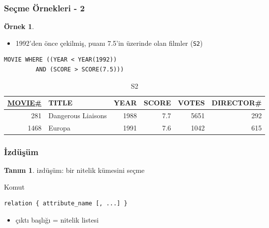 \documentclass[dvipsnames]{beamer}
\theoremstyle{definition}
\newtheorem{tanim}[theorem]{Tanım}
\theoremstyle{example}
\newtheorem{ornek}[theorem]{Örnek}
\theoremstyle{plain}
\begin{document}
\begin{frame}[fragile]
  \frametitle{Seçme Örnekleri - 2}

  \begin{ornek}
    \begin{itemize}
      \item 1992'den önce çekilmiş, puanı 7.5'in üzerinde olan filmler
        (\texttt{S2})
    \end{itemize}

    \begin{lstlisting}
MOVIE WHERE ((YEAR < YEAR(1992))
         AND (SCORE > SCORE(7.5)))
    \end{lstlisting}

    \pause
    \vspace{-10pt}
    \begin{tiny}
    \begin{table}
      \caption{S2}
      \begin{tabular}{|r|l|r|r|r|r|}\hline
\underline{MOVIE\#} & TITLE & YEAR & SCORE & VOTES & DIRECTOR\#\\[2pt]\hline\hline
   281 & Dangerous Liaisons & 1988 &   7.7 &  5651 &        292\\\hline
  1468 & Europa             & 1991 &   7.6 &  1042 &        615\\\hline
      \end{tabular}
    \end{table}
    \end{tiny}
  \end{ornek}
\end{frame}

\begin{frame}[fragile]
  \frametitle{İzdüşüm}

  \begin{tanim}
    \alert{izdüşüm}: bir nitelik kümesini seçme
  \end{tanim}

  \pause
  \begin{block}{Komut}
    \begin{lstlisting}
relation { attribute_name [, ...] }
    \end{lstlisting}
  \end{block}

  \pause
  \begin{itemize}
    \item çıktı başlığı = nitelik listesi
  \end{itemize}
\end{frame}
\end{document}
